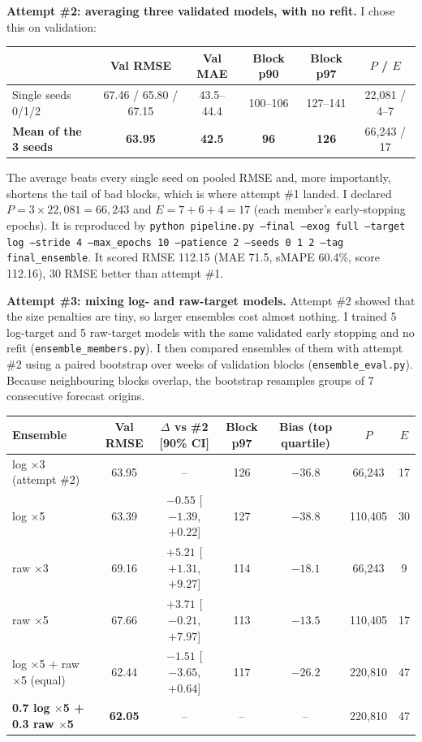 \documentclass[11pt]{article}
\begin{document}
\textbf{Attempt \#2: averaging three validated models, with no refit.} I chose this on validation:
\begin{center}\small
\begin{tabular}{lccccc}\toprule
 & Val RMSE & Val MAE & Block p90 & Block p97 & $P$ / $E$\\\midrule
Single seeds 0/1/2 & 67.46 / 65.80 / 67.15 & 43.5--44.4 & 100--106 & 127--141 & 22{,}081 / 4--7\\
\textbf{Mean of the 3 seeds} & \textbf{63.95} & \textbf{42.5} & \textbf{96} & \textbf{126} & 66{,}243 / 17\\\bottomrule
\end{tabular}\end{center}
The average beats every single seed on pooled RMSE and, more importantly, shortens the tail of bad
blocks, which is where attempt \#1 landed. I declared $P = 3\times22{,}081 = 66{,}243$ and
$E = 7+6+4 = 17$ (each member's early-stopping epochs). It is reproduced by
\texttt{python pipeline.py --final --exog full --target log --stride 4 --max\_epochs 10
--patience 2 --seeds 0 1 2 --tag final\_ensemble}. It scored RMSE 112.15 (MAE 71.5, sMAPE 60.4\%,
score 112.16), 30 RMSE better than attempt \#1.

\textbf{Attempt \#3: mixing log- and raw-target models.} Attempt \#2 showed that the size penalties
are tiny, so larger ensembles cost almost nothing. I trained 5 log-target and 5 raw-target models
with the same validated early stopping and no refit (\texttt{ensemble\_members.py}). I then compared
ensembles of them with attempt \#2 using a paired bootstrap over weeks of validation blocks
(\texttt{ensemble\_eval.py}). Because neighbouring blocks overlap, the bootstrap resamples groups
of 7 consecutive forecast origins.
\begin{center}\footnotesize\setlength{\tabcolsep}{4pt}
\begin{tabular}{lcccccc}\toprule
Ensemble & Val RMSE & $\Delta$ vs \#2 [90\% CI] & Block p97 & Bias (top quartile) & $P$ & $E$\\\midrule
log $\times$3 (attempt \#2) & 63.95 & -- & 126 & $-36.8$ & 66{,}243 & 17\\
log $\times$5 & 63.39 & $-0.55$ [$-1.39$, $+0.22$] & 127 & $-38.8$ & 110{,}405 & 30\\
raw $\times$3 & 69.16 & $+5.21$ [$+1.31$, $+9.27$] & 114 & $-18.1$ & 66{,}243 & 9\\
raw $\times$5 & 67.66 & $+3.71$ [$-0.21$, $+7.97$] & 113 & $-13.5$ & 110{,}405 & 17\\
log $\times$5 + raw $\times$5 (equal) & 62.44 & $-1.51$ [$-3.65$, $+0.64$] & 117 & $-26.2$ & 220{,}810 & 47\\
\textbf{0.7 log $\times$5 + 0.3 raw $\times$5} & \textbf{62.05} & -- & -- & -- & 220{,}810 & 47\\\bottomrule
\end{tabular}\end{center}
\end{document}
